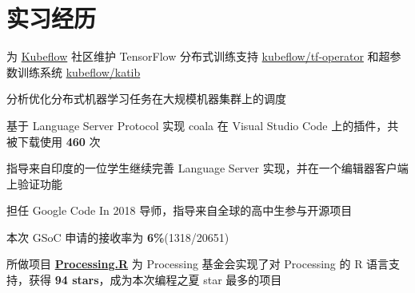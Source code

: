 \documentclass[]{deedy-resume-openfont}
\begin{document}
\begin{minipage}[t]{0.68\textwidth}


\section{实习经历}

\sectionsep
{}
\vspace{\topsep}
\begin{tightemize}
    \item 为 \href{https://github.com/kubeflow/kubeflow}{Kubeflow} 社区维护 TensorFlow 分布式训练支持 \href{https://github.com/kubeflow/tf-operator}{kubeflow/tf-operator} 和超参数训练系统 \href{https://github.com/kubeflow/katib}{kubeflow/katib}
    \item 分析优化分布式机器学习任务在大规模机器集群上的调度
\end{tightemize}
\sectionsep

\sectionsep
{}
\vspace{\topsep}
\begin{tightemize}
    \item 基于 Language Server Protocol 实现 coala 在 Visual Studio Code 上的插件，共被下载使用 \textbf{460} 次
    \item 指导来自印度的一位学生继续完善 Language Server 实现，并在一个编辑器客户端上验证功能
\end{tightemize}
\sectionsep

\sectionsep
{}
\vspace{\topsep}
\begin{tightemize}
    \item 担任 Google Code In 2018 导师，指导来自全球的高中生参与开源项目
\end{tightemize}
\sectionsep

\sectionsep
{}
\vspace{\topsep}
\begin{tightemize}
    \item 本次 GSoC 申请的接收率为 \textbf{6\%}(1318/20651)
    \item 所做项目 \href{https://github.com/gaocegege/Processing.R}{\bf Processing.R} 为 Processing 基金会实现了对 Processing 的 R 语言支持，获得 \textbf{94 stars}，成为本次编程之夏 star 最多的项目
\end{tightemize}
\sectionsep


\end{minipage}
\end{document}
